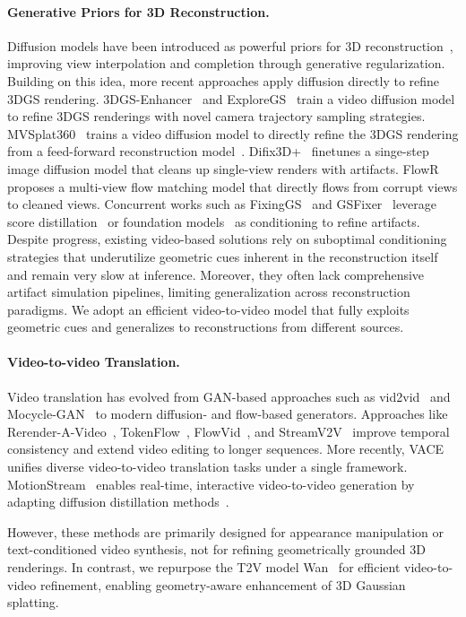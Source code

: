 \paragraph{Generative Priors for 3D Reconstruction.}
Diffusion models have been introduced as powerful priors for 3D reconstruction~\cite{chan2023genvs,wu2023reconfusion,yu2024viewcrafter,liu2024reconx,zhou2025stable,ren2025gen3c,jiang2025geo4d,teng2025fvgen,bao2025free,zhong2025guidevd,paliwal2025ri3d,lu2025matrix3d}, improving view interpolation and completion through generative regularization. Building on this idea, more recent approaches apply diffusion directly to refine 3DGS rendering. 3DGS-Enhancer~\cite{liu2024dgsenhancer} and ExploreGS~\cite{Kim_2025_ExploreGS} train a video diffusion model to refine 3DGS renderings with novel camera trajectory sampling strategies. MVSplat360~\cite{chen2024mvsplat360} trains a video diffusion model to directly refine the 3DGS rendering from a feed-forward reconstruction model~\cite{chen2024mvsplat}. Difix3D+~\cite{wu2025difix3d} finetunes a singe-step image diffusion model that cleans up single-view renders with artifacts. 
FlowR~\cite{fischer2025flowr} proposes a multi-view flow matching model that directly flows from corrupt views to cleaned views. Concurrent works such as FixingGS~\cite{wang2025fixinggs} and GSFixer~\cite{yin2025gsfixer} leverage score distillation~\cite{poole2022dreamfusion} or foundation models~\cite{wang2025vggt,caron2021emerging} as conditioning to refine artifacts. 
Despite progress, existing video-based solutions rely on suboptimal conditioning strategies that underutilize geometric cues inherent in the reconstruction itself and remain very slow at inference. 
Moreover, they often lack comprehensive artifact simulation pipelines, limiting generalization across reconstruction paradigms. 
We adopt an efficient video-to-video model that fully exploits geometric cues and generalizes to reconstructions from different sources.

\paragraph{Video-to-video Translation.} 
Video translation has evolved from GAN-based approaches such as vid2vid~\cite{wang2018vid2vid} and Mocycle-GAN~\cite{mocyclegan2019} to modern diffusion- and flow-based generators. Approaches like Rerender-A-Video~\cite{yang2023rerender}, TokenFlow~\cite{geyer2023tokenflow}, FlowVid~\cite{liang2023flowvid}, and StreamV2V~\cite{liang2024streamv2v} improve temporal consistency and extend video editing to longer sequences. More recently, VACE~\cite{vace_wan} unifies diverse video-to-video translation tasks under a single framework. MotionStream~\cite{shin2025motionstream} enables real-time, interactive video-to-video generation by adapting diffusion distillation methods~\cite{yin2024dmd,huang2025selfforcing}.

However, these methods are primarily designed for appearance manipulation or text-conditioned video synthesis, not for refining geometrically grounded 3D renderings. 
In contrast, we repurpose the T2V model Wan~\cite{wan2025} for efficient video-to-video refinement, enabling geometry-aware enhancement of 3D Gaussian splatting.
 
